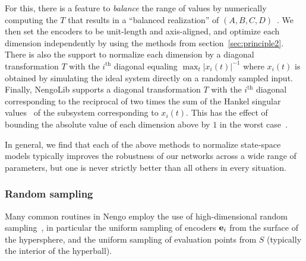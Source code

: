 For this, there is a feature to \emph{balance} the range of values by numerically computing the $T$ that results in a ``balanced realization'' of $(A\text{,}\, B\text{,}\, C\text{,}\, D)$~\citep{laub1987computation, perevapproximation}.
We then set the encoders to be unit-length and axis-aligned, and optimize each dimension independently by using the methods from section~\ref{sec:principle2}.
There is also the support to normalize each dimension by a diagonal transformation $T$ with the $i^{\text{th}}$ diagonal equaling $\max_t \left| x_i(t) \right|^{-1}$ where $x_i(t)$ is obtained by simulating the ideal system directly on a randomly sampled input.
Finally, NengoLib supports a diagonal transformation $T$ with the $i^{\text{th}}$ diagonal corresponding to the reciprocal of two times the sum of the Hankel singular values~\citep{glover1987bounds} of the subsystem corresponding to $x_i(t)$.
This has the effect of bounding the absolute value of each dimension above by $1$ in the worst case~\citep{khaisongkram2007computing}.

In general, we find that each of the above methods to normalize state-space models typically improves the robustness of our networks across a wide range of parameters, but one is never strictly better than all others in every situation.



\subsubsection{Random sampling}

Many common routines in Nengo employ the use of high-dimensional random sampling~\citep{voelker2017, gosmann2018}, in particular the uniform sampling of encoders $\mathbf{e}_i$ from the surface of the hypersphere, and the uniform sampling of evaluation points from $S$ (typically the interior of the hyperball).

